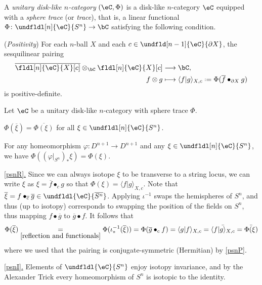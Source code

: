 \documentclass[12pt,reqno]{amsart}
\newcommand{\psn}{\Phi}
\newcommand{\C}{\eC}
\newcommand{\blt}{\bullet}
\newcommand{\fcj}[1]{\overline{#1}}
\newcommand{\orev}{\overline}
\newcommand{\bkt}[2]{\langle #1|#2 \rangle}
\newcommand{\defn}[1]{\emph{#1}}
\newcommand{\itemstep}[1]{\smallskip\noindent\underline{#1}}
\DeclareRobustCommand{\coloneq}{\mathrel{\vcenter{\baselineskip0.5ex\lineskiplimit0pt\hbox{\scriptsize{\upshape.}}\hbox{\scriptsize{\upshape.}}}}=}
\begin{document}
\begin{definition}
  \label{def:unitary disk-like n-category}
  A \defn{unitary disk-like $n$-category} $(\C,\psn)$ is a disk-like $n$-category $\C$ equipped with a \defn{sphere trace} (or \defn{trace}), that is, a linear functional $\psn\colon\undfldl[n]{\C}{S^n}\to\bC$ satisfying the following condition.
  \begin{lst}[font=\upshape]
    \item[($\psn$P)]\label{psnP}
    (\emph{Positivity})
    For each $n$-ball $X$ and each $c\in \undfld[n-1]{\C}{\partial X}$, the sesquilinear pairing
    \begin{equation}\label{disk pairings}
      \begin{aligned}
        \orev{\fldl[n]{\C}{X}[c]}\otimes_{\bC}\fldl[n]{\C}{X}[c] & \longrightarrow \bC,
        \\
        f\otimes g                      & \longmapsto \bkt{f}{g}_{X,c}\coloneq\psn(\fcj f\blt_{\partial X} g)
      \end{aligned}
    \end{equation}
    is positive-definite.
  \end{lst}
\end{definition}

\begin{proposition}
  \label{prop:psnP implies}
  Let $\C$ be a unitary disk-like $n$-category with sphere trace $\psn$.
  \begin{lst}[font=\upshape]
    \item[($\psn$R)]\label{psnR}
    $\psn(\fcj\xi)=\overline{\psn(\xi)}$ for all $\xi\in\undfldl[n]{\C}{S^n}$.
    \item[($\psn$I)]\label{psnI}
    For any homeomorphism $\varphi\colon D^{n+1}\to D^{n+1}$ and any $\xi\in\undfldl[n]{\C}{S^n}$, we have $\psn((\varphi  |_{S^n})_*\xi)=\psn(\xi)$.
  \end{lst}
\end{proposition}

\begin{pf}
  \itemstep{\ref{psnR}.} Since we can always isotope $\xi$ to be transverse to a string locus, we can write $\xi$ as $\xi = \fcj f \blt_c g$ so that $\psn(\xi) = \bkt{f}{g}_{X,c}$. Note that $\fcj \xi = f \blt_{\fcj c} \fcj g \in \undfldl{\C}{\orev{S^n}}$. Applying $\iota^{-1}$ swaps the hemispheres of $S^n$, and thus (up to isotopy) corresponds to swapping the position of the fields on $S^n$, thus mapping $f \blt \fcj g$ to $\fcj g \blt f$. It follows that
  \[
    \psn(\fcj \xi) \underset{\eqref{reflection and functionals}}=\psn(\iota_*^{-1}(\fcj \xi)) = \psn(\fcj g \blt_c f) = \bkt{g}{f}_{X,c}= \bar{\bkt{f}{g}_{X,c}}=\bar{\psn(\xi)}
  \]
  where we used that the pairing is conjugate-symmetric (Hermitian) by \ref{psnP}. 
  
  \itemstep{\ref{psnI}.} Elements of $\undfldl{\C}{S^n}$ enjoy isotopy invariance, and by the Alexander Trick every homeomorphism of $S^n$ is isotopic to the identity.
\end{pf}
\end{document}
